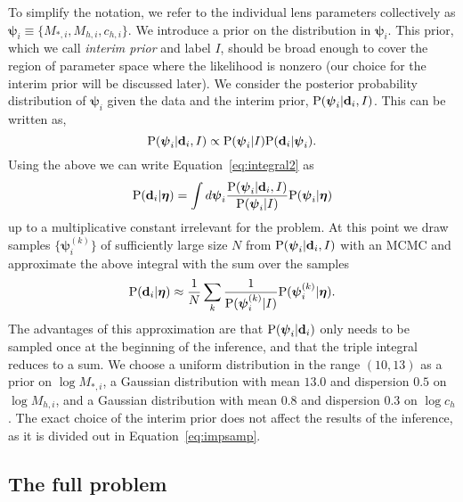 \documentclass[usenatbib]{mnras}
\def\mstari{M_{*, i}}
\def\mhaloi{M_{h, i}}
\def\chalo{c_{h}}
\def\chaloi{c_{h, i}}
\def\hyperp{\boldsymbol{\eta}}
\def\individi{\boldsymbol{\psi}_i}
\def\individsamp{\boldsymbol{\psi}_{i}^{(k)}}
\def\datai{\mathbf{d}_i}
\def\Eref#1{Equation~\ref{#1}\xspace}
\def\pr{{\rm P}}
\begin{document}
To simplify the notation, we refer to the individual lens parameters collectively as $\individi \equiv \{\mstari, \mhaloi, \chaloi\}$. 
We introduce a prior on the distribution in $\individi$. This prior, which we call {\em interim prior} and label $I$, should be broad enough to cover the region of parameter space where the likelihood is nonzero (our choice for the interim prior will be discussed later).
We consider the posterior probability distribution of $\individi$ given the data and the interim prior, $\pr(\individi | \datai, I)$. This can be written as, 
\begin{equation}
\pr(\individi | \datai, I) \propto \pr(\individi | I) \pr(\datai | \individi).
\end{equation}
Using the above we can write \Eref{eq:integral2} as
\begin{equation}
\pr(\datai | \hyperp) = \int d\individi 
\frac{\pr(\individi | \datai, I)}{\pr(\individi | I)} \pr(\individi | \hyperp)
\end{equation}
up to a multiplicative constant irrelevant for the problem.
At this point we draw samples $\{\individsamp\}$ of sufficiently large size $N$ from $\pr(\individi | \datai, I)$ with an MCMC and approximate the above integral with the sum over the samples
\begin{equation}\label{eq:impsamp}
\pr(\datai | \hyperp) \approx \frac{1}{N} \sum_k \frac{1}{\pr(\individsamp | I)} \pr(\individsamp | \hyperp). 
\end{equation}
%
The advantages of this approximation are that $\pr(\individi | \datai)$ only needs to be sampled once at the beginning of the inference, and that the triple integral reduces to a sum.
We choose a uniform distribution in the range $(10, 13)$ as a prior on $\log{\mstari}$, a Gaussian distribution with mean $13.0$ and dispersion $0.5$ on $\log{\mhaloi}$, and a Gaussian distribution with mean $0.8$ and dispersion $0.3$ on $\log{\chalo}$. The exact choice of the interim prior does not affect the results of the inference, as it is divided out in \Eref{eq:impsamp}.

\subsection{The full problem}\label{ssec:fullmodel}
\end{document}

